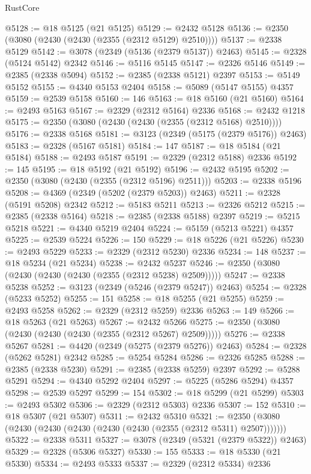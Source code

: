 \begin{lexlean}{RustCore}
\begin{coremodule}
@5128 := @18 @5125 (@21 @5125)
@5129 := @2432 @5128
@5136 := @2350 (@3080 (@2430 (@2430 (@2355 (@2312 @5129) @2510))))
@5137 := @2338 @5129
@5142 := @3078 (@2349 (@5136 (@2379 @5137)) @2463)
@5145 := @2328 (@5124 @5142) @2342
@5146 := @5116 @5145
@5147 := @2326 @5146
@5149 := @2385 (@2338 @5094)
@5152 := @2385 (@2338 @5121) @2397
@5153 := @5149 @5152
@5155 := @4340 @5153 @2404
@5158 := @5089 (@5147 @5155) @4357
@5159 := @2539 @5158
@5160 := 146
@5163 := @18 @5160 (@21 @5160)
@5164 := @2493 @5163
@5167 := @2329 (@2312 @5164) @2336
@5168 := @2432 @1218
@5175 := @2350 (@3080 (@2430 (@2430 (@2355 (@2312 @5168) @2510))))
@5176 := @2338 @5168
@5181 := @3123 (@2349 (@5175 (@2379 @5176)) @2463)
@5183 := @2328 (@5167 @5181)
@5184 := 147
@5187 := @18 @5184 (@21 @5184)
@5188 := @2493 @5187
@5191 := @2329 (@2312 @5188) @2336
@5192 := 145
@5195 := @18 @5192 (@21 @5192)
@5196 := @2432 @5195
@5202 := @2350 (@3080 (@2430 (@2355 (@2312 @5196) @2511)))
@5203 := @2338 @5196
@5208 := @4369 (@2349 (@5202 (@2379 @5203)) @2463)
@5211 := @2328 (@5191 @5208) @2342
@5212 := @5183 @5211
@5213 := @2326 @5212
@5215 := @2385 (@2338 @5164)
@5218 := @2385 (@2338 @5188) @2397
@5219 := @5215 @5218
@5221 := @4340 @5219 @2404
@5224 := @5159 (@5213 @5221) @4357
@5225 := @2539 @5224
@5226 := 150
@5229 := @18 @5226 (@21 @5226)
@5230 := @2493 @5229
@5233 := @2329 (@2312 @5230) @2336
@5234 := 148
@5237 := @18 @5234 (@21 @5234)
@5238 := @2432 @5237
@5246 := @2350 (@3080 (@2430 (@2430 (@2430 (@2355 (@2312 @5238) @2509)))))
@5247 := @2338 @5238
@5252 := @3123 (@2349 (@5246 (@2379 @5247)) @2463)
@5254 := @2328 (@5233 @5252)
@5255 := 151
@5258 := @18 @5255 (@21 @5255)
@5259 := @2493 @5258
@5262 := @2329 (@2312 @5259) @2336
@5263 := 149
@5266 := @18 @5263 (@21 @5263)
@5267 := @2432 @5266
@5275 := @2350 (@3080 (@2430 (@2430 (@2430 (@2355 (@2312 @5267) @2509)))))
@5276 := @2338 @5267
@5281 := @4420 (@2349 (@5275 (@2379 @5276)) @2463)
@5284 := @2328 (@5262 @5281) @2342
@5285 := @5254 @5284
@5286 := @2326 @5285
@5288 := @2385 (@2338 @5230)
@5291 := @2385 (@2338 @5259) @2397
@5292 := @5288 @5291
@5294 := @4340 @5292 @2404
@5297 := @5225 (@5286 @5294) @4357
@5298 := @2539 @5297
@5299 := 154
@5302 := @18 @5299 (@21 @5299)
@5303 := @2493 @5302
@5306 := @2329 (@2312 @5303) @2336
@5307 := 152
@5310 := @18 @5307 (@21 @5307)
@5311 := @2432 @5310
@5321 := @2350 (@3080 (@2430 (@2430 (@2430 (@2430 (@2430 (@2355 (@2312 @5311) @2507)))))))
@5322 := @2338 @5311
@5327 := @3078 (@2349 (@5321 (@2379 @5322)) @2463)
@5329 := @2328 (@5306 @5327)
@5330 := 155
@5333 := @18 @5330 (@21 @5330)
@5334 := @2493 @5333
@5337 := @2329 (@2312 @5334) @2336

\end{coremodule}
\end{lexlean}
